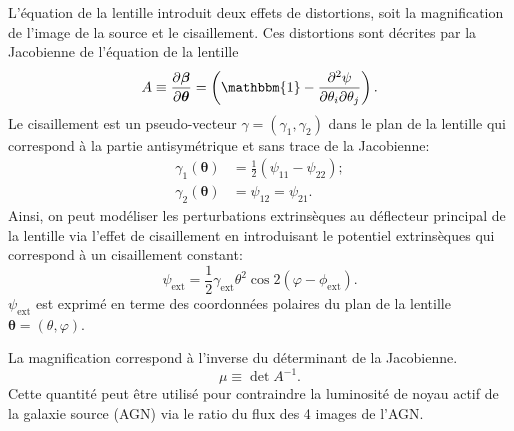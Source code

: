\documentclass[times,10pt,twocolumn]{article}
\begin{document}
L'équation de la lentille introduit deux effets de distortions, soit la magnification de l'image 
de la source et le cisaillement. Ces distortions sont décrites par la Jacobienne de 
l'équation de la lentille
\begin{equation}\label{eq:Jacobian} 
        A \equiv \frac{\partial \boldsymbol{\beta}}{\partial \boldsymbol{\theta}}
= \left( \mathbbm{1} - \frac{\partial^2 \psi}{\partial \theta_i \partial \theta_j} \right). 
\end{equation} 
Le cisaillement est un pseudo-vecteur $\gamma = (\gamma_1, \gamma_2)$ dans le plan de la lentille 
qui correspond à la partie antisymétrique et sans trace de la Jacobienne:
\begin{align}
        \gamma_1(\boldsymbol{\theta}) &=  \frac{1}{2} \left( \psi_{11} - \psi_{22} \right); \\
        \gamma_2(\boldsymbol{\theta}) &= \psi_{12} = \psi_{21}.
\end{align}
Ainsi, on peut modéliser les perturbations extrinsèques au déflecteur principal de la lentille 
via l'effet de cisaillement en introduisant le potentiel extrinsèques qui correspond à un 
cisaillement constant:
\begin{equation}\label{eq:gamma_ext} 
        \psi_{\mathrm{ext}}  = \frac{1}{2} \gamma_{\mathrm{ext}} \theta^2 
        \cos 2(\varphi - \phi_{\mathrm{ext}}).
\end{equation} 
$\psi_{\mathrm{ext}}$ est exprimé en terme des coordonnées polaires du plan de la lentille 
$\boldsymbol{\theta} = (\theta, \varphi)$.

La magnification correspond à l'inverse du déterminant de la Jacobienne. 
\begin{equation}\label{eq:Magnification} 
        \mu \equiv \det{A}^{-1}.
\end{equation} 
Cette quantité peut être utilisé pour contraindre la luminosité de noyau actif de la galaxie 
source (AGN) via le ratio du flux des 4 images de l'AGN.
\end{document}
